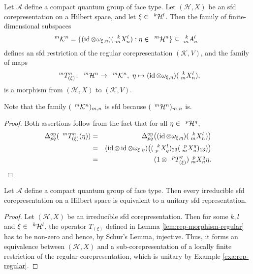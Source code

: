 \begin{Lem} \label{lem:rep-morphism-regular}
  Let $\mathscr{A}$ define a compact quantum group of face type. Let $(\mathcal{H},X)$ be an sfd corepresentation on a Hilbert space, and let $\xi \in
  \Gru{\mathcal{H}}{k}{l}$. Then the family of finite-dimensional
  subspaces
  \begin{align*}
   \Gru{\mathcal{K}}{m}{n}  &=  \{ (\id \otimes
   \omega_{\xi,\eta})(\Gr{X}{k}{l}{m}{n}) : \eta \in
   \Gru{\mathcal{H}}{m} {n}\} \subseteq \Gr{A}{k}{l}{m}{n}
  \end{align*}%
  defines an sfd restriction of the regular corepresentation
  $(\mathcal{K},V)$, and the family of maps
  \begin{align*}
    \Gru{T_{(\xi)}}{m}{n} \colon \Gru{\mathcal{H}}{m}{n} \to
    \Gru{\mathcal{K}}{m}{n}, \ \eta \mapsto (\id \otimes
    \omega_{\xi,\eta})(\Gr{X}{k}{l}{m}{n}),
  \end{align*}
  is a morphism from $(\mathcal{H},X)$ to $(\mathcal{K},V)$. %
\end{Lem}
Note that the family $(\Gru{\mathcal{K}}{m}{n})_{m,n}$ is sfd because $(\Gru{\mathcal{H}}{m}{n})_{m,n}$
is. 
\begin{proof} Both assertions  follow from the fact
  that for all $\eta \in \Gru{\mathcal{H}}{p}{q}$,
\begin{eqnarray*}
\Delta^{\op}_{pq}(\Gru{T_{(\xi)}}{m}{n}(\eta)) &=&  \Delta_{pq}^{\op}\big((\id \otimes
  \omega_{\xi,\eta})(\Gr{X}{k}{l}{m}{n})\big)\\
 &=&(\id \otimes \id \otimes \omega_{\xi,\eta})\big(
  (\Gr{X}{k}{l}{p}{q})_{23}(\Gr{X}{p}{q}{m}{n})_{13})\big) \\ &=&(1
  \otimes \Gru{T_{(\xi)}}{p}{q})\Gr{X}{p}{q}{m}{n} \eta.
\end{eqnarray*}
\end{proof}
\begin{Prop}  \label{prop:rep-unitarisable}
  Let $\mathscr{A}$ define a compact quantum group of face type. Then every irreducible sfd corepresentation on a Hilbert space
  is equivalent to a unitary sfd representation.
\end{Prop}
\begin{proof}
  Let $(\mathcal{H},X)$ be an irreducible sfd
  corepresentation. Then for some $k,l$ and $\xi \in
  \Gru{\mathcal{H}}{k}{l}$,  the operator  $T_{(\xi)}$  defined in
  Lemma \ref{lem:rep-morphism-regular} has to be non-zero and hence,
  by Schur's Lemma, injective. Thus, it forms an equivalence between
  $(\mathcal{H},X)$ and a sub-corepresentation of a locally finite
  restriction of the regular corepresentation, which is unitary by
  Example \ref{exa:rep-regular}.
\end{proof}

